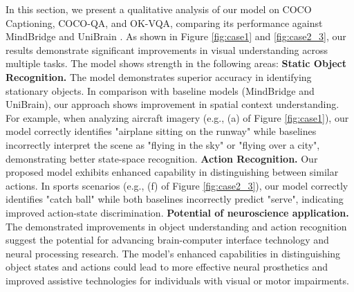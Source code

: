 





In this section, we present a qualitative analysis of our model on COCO Captioning, COCO-QA, and OK-VQA, comparing its performance against MindBridge \cite{wang2024mindbridge} and UniBrain \cite{wang2024unibrain}. As shown in Figure \ref{fig:case1} and \ref{fig:case2_3}, our results demonstrate significant improvements in visual understanding across multiple tasks. The model shows strength in the following areas:
\textbf{Static Object Recognition. }The model demonstrates superior accuracy in identifying stationary objects. In comparison with baseline models (MindBridge and UniBrain), our approach shows improvement in spatial context understanding. For example, when analyzing aircraft imagery (e.g., (a) of Figure \ref{fig:case1}), our model correctly identifies "airplane sitting on the runway" while baselines incorrectly interpret the scene as "flying in the sky" or "flying over a city", demonstrating better state-space recognition. \textbf{Action Recognition. }Our proposed model exhibits enhanced capability in distinguishing between similar actions. In sports scenarios (e.g., (f) of Figure \ref{fig:case2_3}), our model correctly identifies "catch ball" while both baselines incorrectly predict "serve", indicating improved action-state discrimination.  \textbf{Potential of neuroscience application. }The demonstrated improvements in object understanding and action recognition suggest the potential for advancing brain-computer interface technology and neural processing research. The model's enhanced capabilities in distinguishing object states and actions could lead to more effective neural prosthetics and improved assistive technologies for individuals with visual or motor impairments.



